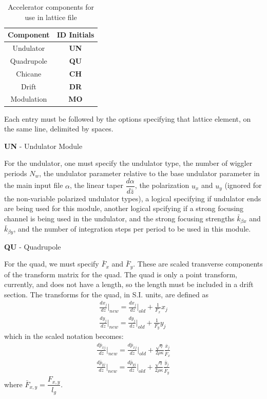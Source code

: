 \documentclass[12pt]{article}%
\begin{document}
\begin{table}
\centering
\caption[Input in Lattice File]{Accelerator components for use in lattice file}
\begin{tabular}{|  c   | c  |}
\hline
Component & ID Initials  \\
\hline
Undulator & {\bf UN} \\
\hline
Quadrupole & {\bf QU} \\
\hline
Chicane & {\bf CH} \\
\hline
Drift & {\bf DR} \\
\hline
Modulation & {\bf MO} \\
\hline
\end{tabular}
\label{tableLat}
\vspace*{-\baselineskip}
\end{table}









Each entry must be followed by the options specifying that lattice element, on the same line, delimited by spaces.

{\bf UN} - Undulator Module

For the undulator,  one must specify the undulator type, the number of wiggler periods $N_w$, the undulator parameter relative to the base undulator parameter in the main input file $\alpha$, the linear taper $\dfrac{d \alpha}{d \bar{z}}$, the polarization $u_x$ and $u_y$ (ignored for the non-variable polarized undulator types), a logical specifying if undulator ends are being used for this module, another logical spcifying if a strong focusing channel is being used in the undulator, and the strong focusing strengths $\bar{k}_{\beta x}$ and $\bar{k}_{\beta y}$, and the number of integration steps per period to be used in this module.

{\bf QU} - Quadrupole

For the quad, we must specify $\bar{F}_x$ and $\bar{F}_y$. These are scaled transverse components of the transform matrix for the quad. The quad is only a point transform, currently, and does not have a length, so the length must be included in a drift section. The transforms for the quad, in S.I. units, are defined as
\begin{align}
\frac{d x_j}{d z}  \bigg|_{new} = \frac{d x_j}{d z} \bigg|_{old} + \frac{1}{F_x} x_j \\
\frac{d y_j}{d z}  \bigg|_{new} = \frac{d y_j}{d z} \bigg|_{old} + \frac{1}{F_y} y_j
\end{align}
which in the scaled notation becomes:
\begin{align}
\frac{d \bar{p}_{xj}}{d \bar{z}} \bigg|_{new} = \frac{d \bar{p}_{xj}}{d \bar{z}}  \bigg|_{old} +\frac{\sqrt{\eta}}{2\rho\kappa} \frac{\bar{x}_j}{\bar{F}_x} \\
\frac{d \bar{p}_{yj}}{d \bar{z}}  \bigg|_{new} = \frac{d \bar{p}_{yj}}{d \bar{z}}  \bigg|_{old} +\frac{\sqrt{\eta}}{2\rho\kappa} \frac{\bar{y}_j}{\bar{F}_y}
\end{align}
where $\bar{F}_{x,y} = \dfrac{F_{x,y}}{l_g}$.
\end{document}
